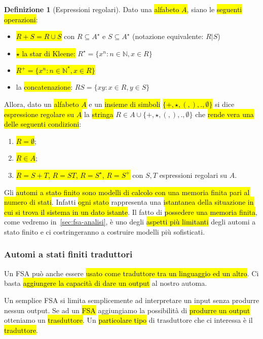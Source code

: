\documentclass[a4paper,11pt,twoside]{article}
\theoremstyle{plain}
\theoremstyle{definition}
\newtheorem{defn}{Definizione}[section]
\theoremstyle{remark}
\begin{document}
\begin{defn}[Espressioni regolari]\label{def:regex}
  Dato una \hl{alfabeto $A$}, siano le \hl{seguenti operazioni}:

  \begin{itemize}
    \item \hl{$R + S = R \cup S$} con $R \subseteq A^\star$ e
      $S \subseteq A^\star$ (notazione equivalente: $R | S$)
    \item \hl{$\star$ la star di Kleene:}
      $R^\star = \{x^n : n \in \mathbb{N}, x \in R\}$
    \item \hl{$R^+ = \{x^n : n \in \mathbb{N}^*, x \in R\}$}
    \item la \hl{concatenazione}: $RS = \{xy : x \in R, y \in S\}$
  \end{itemize}

  Allora, dato un \hl{alfabeto $A$} e un \hl{insieme di simboli}
  \hl{$\{+,\star,(,),.,\emptyset\}$} si dice \hl{espressione regolare su $A$} la
  \hl{stringa} $R \in A \cup \{+,\star,(,),.,\emptyset\}$ che \hl{rende vera una
  delle seguenti condizioni}:

  \begin{enumerate}
    \item \hl{$R = \emptyset$};
    \item \hl{$R \in A$};
    \item \hl{$R = S + T$, $R = ST$, $R = S^\star$, $R = S^+$} con $S,T$
      espressioni regolari su $A$.
  \end{enumerate}
\end{defn}

Gli \hl{automi a stato finito sono modelli di calcolo con una memoria finita
pari al numero di stati}. Infatti \hl{ogni stato} rappresenta una \hl{istantanea
della situazione in cui si trova il sistema in un dato istante}. Il fatto di
\hl{possedere una memoria finita}, come vedremo in~\ref{sec:fsa-analisi}, è uno
degli \hl{aspetti più limitanti} degli automi a stato finito e ci costringeranno
a costruire modelli più sofisticati.

\subsubsection{Automi a stati finiti traduttori}\label{sec:fsa-trad}

Un FSA può anche essere \hl{usato come traduttore tra un linguaggio ed un
altro}. Ci basta \hl{aggiungere la capacità di dare un output} al nostro automa.

Un semplice FSA si limita semplicemente ad interpretare un input senza produrre
nessun output. Se ad un \hl{FSA} aggiungiamo la possibilità di \hl{produrre un
output} otteniamo un \hl{trasduttore}. Un \hl{particolare tipo} di trasduttore
che ci interessa è il \hl{traduttore}.
\end{document}
